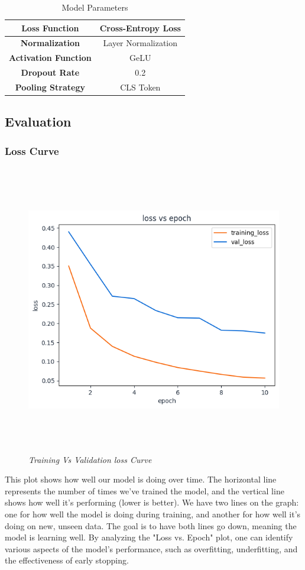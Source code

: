 \begin{table}[h]
\begin{tabular}{|c|c|}
        \hline
        \textbf{Loss Function}                  & Cross-Entropy Loss  \\
        \hline
        \textbf{Normalization}                  & Layer Normalization \\
        \hline
        \textbf{Activation Function}            & GeLU                \\
        \hline
        \textbf{Dropout Rate }                  & 0.2                 \\
        \hline
        \textbf{Pooling Strategy }              & CLS Token           \\
        \hline
    \end{tabular}
    \caption{Model Parameters}
    \label{tab:model-parameters}
\end{table}
\newpage
\subsection{Evaluation}
\subsubsection{Loss Curve}
\begin{figure}[ht]
    \centering
    \includegraphics[width= 5in, height =5in ]{img/lossVsAccuracy.png}
    \caption{\textit{Training Vs Validation loss Curve}}
\end{figure}
This plot shows how well our model is doing over time. The horizontal line represents the number of times we've trained the model, and the vertical line shows how well it's performing (lower is better). We have two lines on the graph: one for how well the model is doing during training, and another for how well it's doing on new, unseen data. The goal is to have both lines go down, meaning the model is learning well. By analyzing the "Loss vs. Epoch" plot, one can identify various aspects of the model's performance, such as overfitting, underfitting, and the effectiveness of early stopping.

